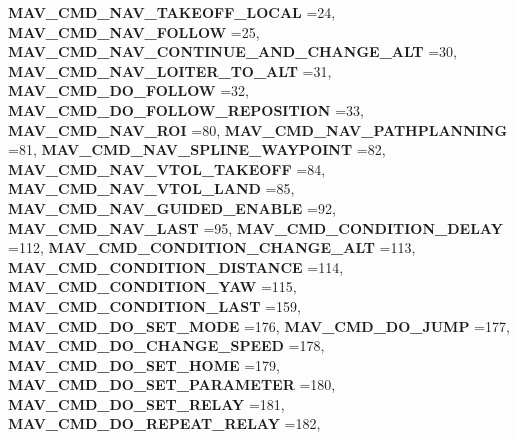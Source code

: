 \begin{DoxyCompactItemize}
\textbf{ M\+A\+V\+\_\+\+C\+M\+D\+\_\+\+N\+A\+V\+\_\+\+T\+A\+K\+E\+O\+F\+F\+\_\+\+L\+O\+C\+AL} =24, 
\newline
\textbf{ M\+A\+V\+\_\+\+C\+M\+D\+\_\+\+N\+A\+V\+\_\+\+F\+O\+L\+L\+OW} =25, 
\textbf{ M\+A\+V\+\_\+\+C\+M\+D\+\_\+\+N\+A\+V\+\_\+\+C\+O\+N\+T\+I\+N\+U\+E\+\_\+\+A\+N\+D\+\_\+\+C\+H\+A\+N\+G\+E\+\_\+\+A\+LT} =30, 
\textbf{ M\+A\+V\+\_\+\+C\+M\+D\+\_\+\+N\+A\+V\+\_\+\+L\+O\+I\+T\+E\+R\+\_\+\+T\+O\+\_\+\+A\+LT} =31, 
\textbf{ M\+A\+V\+\_\+\+C\+M\+D\+\_\+\+D\+O\+\_\+\+F\+O\+L\+L\+OW} =32, 
\newline
\textbf{ M\+A\+V\+\_\+\+C\+M\+D\+\_\+\+D\+O\+\_\+\+F\+O\+L\+L\+O\+W\+\_\+\+R\+E\+P\+O\+S\+I\+T\+I\+ON} =33, 
\textbf{ M\+A\+V\+\_\+\+C\+M\+D\+\_\+\+N\+A\+V\+\_\+\+R\+OI} =80, 
\textbf{ M\+A\+V\+\_\+\+C\+M\+D\+\_\+\+N\+A\+V\+\_\+\+P\+A\+T\+H\+P\+L\+A\+N\+N\+I\+NG} =81, 
\textbf{ M\+A\+V\+\_\+\+C\+M\+D\+\_\+\+N\+A\+V\+\_\+\+S\+P\+L\+I\+N\+E\+\_\+\+W\+A\+Y\+P\+O\+I\+NT} =82, 
\newline
\textbf{ M\+A\+V\+\_\+\+C\+M\+D\+\_\+\+N\+A\+V\+\_\+\+V\+T\+O\+L\+\_\+\+T\+A\+K\+E\+O\+FF} =84, 
\textbf{ M\+A\+V\+\_\+\+C\+M\+D\+\_\+\+N\+A\+V\+\_\+\+V\+T\+O\+L\+\_\+\+L\+A\+ND} =85, 
\textbf{ M\+A\+V\+\_\+\+C\+M\+D\+\_\+\+N\+A\+V\+\_\+\+G\+U\+I\+D\+E\+D\+\_\+\+E\+N\+A\+B\+LE} =92, 
\textbf{ M\+A\+V\+\_\+\+C\+M\+D\+\_\+\+N\+A\+V\+\_\+\+L\+A\+ST} =95, 
\newline
\textbf{ M\+A\+V\+\_\+\+C\+M\+D\+\_\+\+C\+O\+N\+D\+I\+T\+I\+O\+N\+\_\+\+D\+E\+L\+AY} =112, 
\textbf{ M\+A\+V\+\_\+\+C\+M\+D\+\_\+\+C\+O\+N\+D\+I\+T\+I\+O\+N\+\_\+\+C\+H\+A\+N\+G\+E\+\_\+\+A\+LT} =113, 
\textbf{ M\+A\+V\+\_\+\+C\+M\+D\+\_\+\+C\+O\+N\+D\+I\+T\+I\+O\+N\+\_\+\+D\+I\+S\+T\+A\+N\+CE} =114, 
\textbf{ M\+A\+V\+\_\+\+C\+M\+D\+\_\+\+C\+O\+N\+D\+I\+T\+I\+O\+N\+\_\+\+Y\+AW} =115, 
\newline
\textbf{ M\+A\+V\+\_\+\+C\+M\+D\+\_\+\+C\+O\+N\+D\+I\+T\+I\+O\+N\+\_\+\+L\+A\+ST} =159, 
\textbf{ M\+A\+V\+\_\+\+C\+M\+D\+\_\+\+D\+O\+\_\+\+S\+E\+T\+\_\+\+M\+O\+DE} =176, 
\textbf{ M\+A\+V\+\_\+\+C\+M\+D\+\_\+\+D\+O\+\_\+\+J\+U\+MP} =177, 
\textbf{ M\+A\+V\+\_\+\+C\+M\+D\+\_\+\+D\+O\+\_\+\+C\+H\+A\+N\+G\+E\+\_\+\+S\+P\+E\+ED} =178, 
\newline
\textbf{ M\+A\+V\+\_\+\+C\+M\+D\+\_\+\+D\+O\+\_\+\+S\+E\+T\+\_\+\+H\+O\+ME} =179, 
\textbf{ M\+A\+V\+\_\+\+C\+M\+D\+\_\+\+D\+O\+\_\+\+S\+E\+T\+\_\+\+P\+A\+R\+A\+M\+E\+T\+ER} =180, 
\textbf{ M\+A\+V\+\_\+\+C\+M\+D\+\_\+\+D\+O\+\_\+\+S\+E\+T\+\_\+\+R\+E\+L\+AY} =181, 
\textbf{ M\+A\+V\+\_\+\+C\+M\+D\+\_\+\+D\+O\+\_\+\+R\+E\+P\+E\+A\+T\+\_\+\+R\+E\+L\+AY} =182, 
\newline

\end{DoxyCompactItemize}
